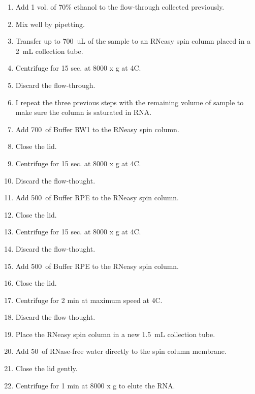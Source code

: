 
\begin{enumerate}
\item Add 1 vol. of 70\% ethanol to the flow-through collected previously. 
\item Mix well by pipetting.
\item Transfer up to 700~uL of the sample to an RNeasy spin column placed in a 2~mL collection tube.
\item Centrifuge for 15 sec. at 8000 x g at 4\degree C.
\item Discard the flow-through.
\item I repeat the three previous steps with the remaining volume of sample to make sure the column is saturated in RNA.
\item Add 700~\uL of Buffer RW1 to the RNeasy spin column.
\item Close the lid.
\item Centrifuge for 15 sec. at 8000 x g at 4\degree C.
\item Discard the flow-thought.
\item Add 500~\uL of Buffer RPE to the RNeasy spin column.
\item Close the lid.
\item Centrifuge for 15 sec. at 8000 x g at 4\degree C.
\item Discard the flow-thought.
\item Add 500~\uL of Buffer RPE to the RNeasy spin column.
\item Close the lid.
\item Centrifuge for 2 min at maximum speed at 4\degree C.
\item Discard the flow-thought.
\item Place the RNeasy spin column in a new 1.5~mL collection tube.
\item Add 50~\uL of RNase-free water directly to the spin column membrane. 
\item Close the lid gently.
\item Centrifuge for 1 min at 8000 x g to elute the RNA.
\end{enumerate}

